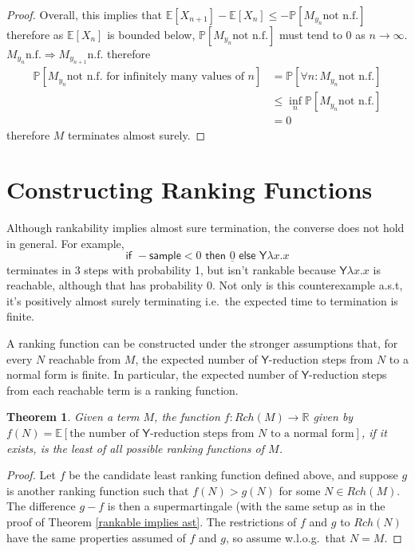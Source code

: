 \documentclass{article}
\newcommand{\tY}{\textsf{Y}}
\newcommand{\tif}[3]{\textsf{if }#1\textsf{ then }#2\textsf{ else }#3}
\newcommand{\tsample}{\textsf{sample}}
\newtheorem{theorem}{Theorem}
\begin{document}
\begin{proof}
Overall, this implies that $\mathbb{E}[X_{n+1}] - \mathbb{E}[X_{n}] \leq -\mathbb P[M_{y_n} \text{not n.f.}]$ therefore as $\mathbb{E}[X_n]$ is bounded below, $\mathbb P[M_{y_n} \text{not n.f.}]$ must tend to 0 as $n \to \infty$. $M_{y_n} \text{n.f.} \Rightarrow M_{y_{n+1}} \text{n.f.}$ therefore 
\begin{align*}
\mathbb P[M_{y_n} \text{not n.f.~for infinitely many values of $n$}]  
& = \mathbb P[\forall n: M_{y_n} \text{not n.f.}] \\
& \leq \inf_n \mathbb P[M_{y_n} \text{not n.f.}] \\
& = 0
\end{align*} 
therefore $M$ terminates almost surely.
\end{proof}

\section{Constructing Ranking Functions}
Although rankability implies almost sure termination, the converse does not hold in general. For example,
\begin{equation}
\tif{-\tsample < 0}{\underline{0}}{\tY \lambda x. x}
\end{equation}
terminates in 3 steps with probability 1, but isn't rankable because $\tY \lambda x. x$ is reachable, although that has probability 0. Not only is this counterexample a.s.t, it's positively almost surely terminating i.e.~the expected time to termination is finite.

A ranking function can be constructed under the stronger assumptions that, for every $N$ reachable from $M$, the expected number of $\tY$-reduction steps from $N$ to a normal form is finite. In particular, the expected number of $\tY$-reduction steps from each reachable term is a ranking function.

\begin{theorem} \label{minimal}
Given a term $M$, the function $f:Rch(M) \to \mathbb R$ given by $f(N) = \mathbb E [\text{the number of }\tY\text{-reduction steps from }N\text{ to a normal form}]$, if it exists, is the least of all possible ranking functions of $M$.
\end{theorem}
\begin{proof}
Let $f$ be the candidate least ranking function defined above, and suppose $g$ is another ranking function such that $f(N) > g(N)$ for some $N \in Rch(M)$. The difference $g - f$ is then a supermartingale (with the same setup as in the proof of Theorem \ref{rankable implies ast}. The restrictions of $f$ and $g$ to $Rch(N)$ have the same properties assumed of $f$ and $g$, so assume w.l.o.g.~that $N=M$.

\end{proof}
\end{document}
